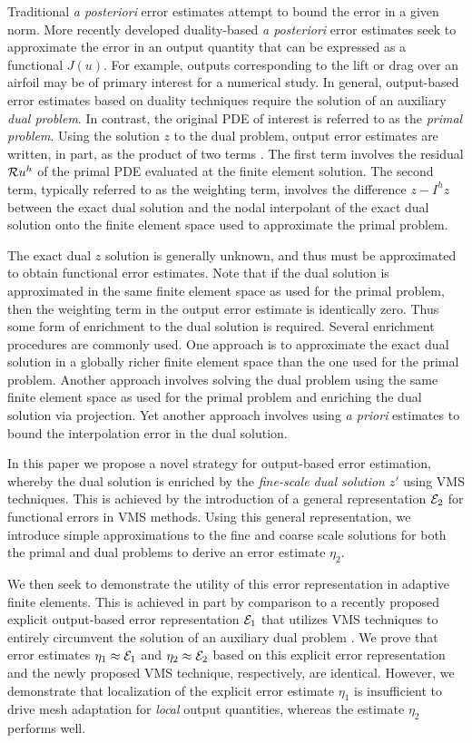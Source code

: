 Traditional \emph{a posteriori} error estimates attempt
to bound the error in a given norm.
More recently developed duality-based \emph{a posteriori} error
estimates \cite{fidkowski2011review} seek to approximate
the error in an output quantity that can be expressed
as a functional $J(u)$. For example, outputs corresponding to
the lift or drag over an airfoil may be of primary
interest for a numerical study. In general, output-based
error estimates based on duality techniques require the
solution of an auxiliary \emph{dual problem}. In contrast,
the original PDE of interest is referred to as the
\emph{primal problem}. Using the solution $z$
to the dual problem, output error estimates are
written, in part, as the product
of two terms \cite{becker2001optimal, bangerth2013adaptive}.
The first term involves the residual $\mathcal{R} u^h$ of the
primal PDE evaluated at the finite element solution.
The second term, typically referred to as the
weighting term, involves the difference $z - I^h z$
between the exact dual solution and the nodal interpolant
of the exact dual solution onto the finite element space
used to approximate the primal problem.

The exact dual $z$ solution is generally unknown,
and thus must be approximated to obtain functional
error estimates. Note that if the dual solution is
approximated in the same finite element space as used
for the primal problem, then the weighting term in the
output error estimate is identically zero.
Thus some form of enrichment to the dual solution
is required. Several enrichment procedures are commonly
used. One approach is to approximate the exact dual
solution in a globally richer finite element space than
the one used for the primal problem. Another approach
involves solving the dual problem using the same finite
element space as used for the primal problem and enriching
the dual solution via projection. Yet another approach
involves using \emph{a priori} estimates to bound the
interpolation error in the dual solution.

In this paper we propose a novel strategy for output-based
error estimation, whereby the dual solution is enriched
by the \emph{fine-scale dual solution} $z'$ using VMS
techniques.
This is achieved by the introduction of a general
representation $\mathcal{E}_2$ for functional errors
in VMS methods. Using this general representation,
we introduce simple approximations to the fine and coarse
scale solutions for both the primal and dual problems to
derive an error estimate $\eta_2$.

We then seek to demonstrate the utility of this error
representation in adaptive finite elements.
This is achieved in part by comparison to a
recently proposed explicit output-based error representation
$\mathcal{E}_1$ that utilizes VMS techniques to
entirely circumvent the solution of an auxiliary dual problem
\cite{hauke2009variational}.
We prove that error estimates $\eta_1 \approx \mathcal{E}_1$
and $\eta_2 \approx \mathcal{E}_2$ based on this explicit error
representation and the newly proposed VMS technique, respectively,
are identical. However, we demonstrate that localization
of the explicit error estimate $\eta_1$ is
insufficient to drive mesh adaptation for \emph{local}
output quantities, whereas the estimate $\eta_2$
performs well.

